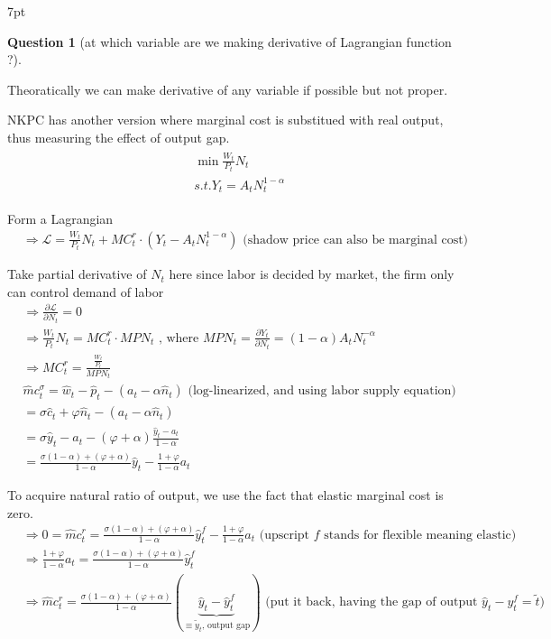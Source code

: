 \documentclass{article}
\newenvironment{redblock}{
\def\FrameCommand{
  \hspace{1pt}
    {\color{LightCoral}
    \vrule width 2pt}
    {\color{redshade}
    \vrule width 4pt}
  \colorbox{redshade}
}
\MakeFramed{
  \advance
  \hsize-
  \width
  \FrameRestore}
\noindent\hspace{-4.55pt}%
\begin{adjustwidth}{}{7pt}
\vspace{2pt}\vspace{2pt}
}
{\vspace{2pt}\end{adjustwidth}\endMakeFramed}
\newtheorem{question}{Question}
\begin{document}
\begin{redblock}
\begin{question}[at which variable are we making derivative of Lagrangian function ?]
\end{question}
Theoratically we can make derivative of any variable if possible but not proper.
\end{redblock}

NKPC has another version where marginal cost is substitued with real output, thus measuring the effect of output gap.
\begin{align}
\begin{split}
& \min \frac{W_t}{P_t}N_t
\\& s.t. Y_t =A_t N_t^{1-\alpha}
\end{split}
\end{align}

Form a Lagrangian
\begin{align}
& \Rightarrow \mathscr{L}=\frac{W_t}{P_t}N_t +MC_t^r\cdot(Y_t -A_t N_t^{1-\alpha})\text{ (shadow price can also be marginal cost)}
\end{align}

Take partial derivative of $N_t$ here since labor is decided by market, the firm only can control demand of labor
\begin{align}
& \Rightarrow \frac{\partial \mathscr{L}}{\partial N_t}=0 
\\& \Rightarrow \frac{W_t}{P_t}N_t=MC^r_t \cdot MP N_t
\text{ , where }MPN_t=\frac{\partial Y_t}{\partial N_t}=(1-\alpha)A_t N_t^{-\alpha}
\\& \Rightarrow MC^r_t=\frac{\frac{W_t}{P_t}}{MPN_t}
\\& \hat mc^{\sigma}_t=\hat w_t -\hat p_t -(a_t-\alpha \hat n_t)\text{ (log-linearized, and using labor supply equation)}
\\& =\sigma \hat c_t +\varphi \hat n_t -(a_t-\alpha \hat n_t )
\\& =\sigma \hat y_t -a_t -(\varphi+\alpha)\frac{\hat y_t -a_t}{1-\alpha}
\\& =\frac{\sigma(1-\alpha)+(\varphi+\alpha)}{1-\alpha}\hat y_t-\frac{1+\varphi}{1-\alpha}a_t
\end{align}

To acquire natural ratio of output, we use the fact that elastic marginal cost is zero.
\begin{align}
& \Rightarrow 0=\hat mc^r_t=\frac{\sigma(1-\alpha)+(\varphi+\alpha)}{1-\alpha}\hat y_t^f-\frac{1+\varphi}{1-\alpha}a_t \text{ (upscript $f$ stands for flexible meaning elastic)}
\\& \Rightarrow \frac{1+\varphi}{1-\alpha}a_t=\frac{\sigma(1-\alpha)+(\varphi+\alpha)}{1-\alpha}\hat y_t^f
\\& \Rightarrow \hat mc_t^r = \frac{\sigma(1-\alpha)+(\varphi+\alpha)}{1-\alpha}(\underbrace{\hat y_t- \hat y_t^f}_{\equiv \tilde y_t \text{, output gap}})
\text{ (put it back, having the gap of output $\hat y_t - y_t^f=\tilde t$)}
\end{align}
\end{document}

